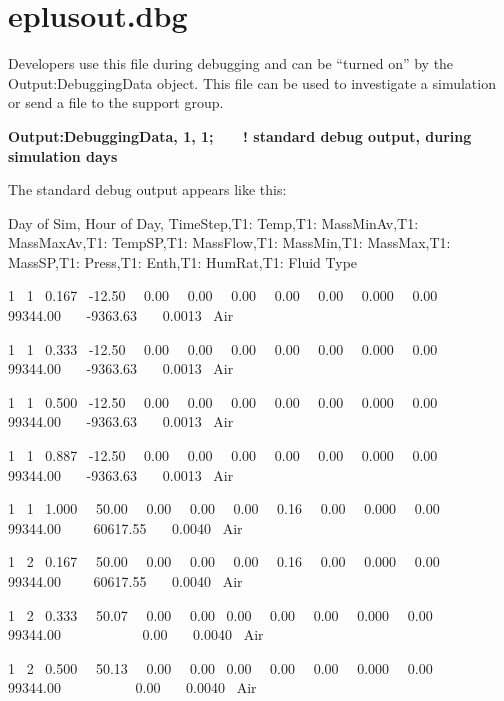 \section{eplusout.dbg}\label{eplusout.dbg}

Developers use this file during debugging and can be ``turned on'' by the Output:DebuggingData object. This file can be used to investigate a simulation or send a file to the support group.

\textbf{Output:DebuggingData, 1, 1;~~~ ! standard debug output, during simulation days}

The standard debug output appears like this:

Day of Sim, Hour of Day, TimeStep,T1: Temp,T1: MassMinAv,T1: MassMaxAv,T1: TempSP,T1: MassFlow,T1: MassMin,T1: MassMax,T1: MassSP,T1: Press,T1: Enth,T1: HumRat,T1: Fluid Type

1~ 1~ 0.167~ -12.50~~ 0.00~~ 0.00~~ 0.00~~ 0.00~~ 0.00~~ 0.000~~ 0.00~~ 99344.00~~~ -9363.63~~~ 0.0013~ Air

1~ 1~ 0.333~ -12.50~~ 0.00~~ 0.00~~ 0.00~~ 0.00~~ 0.00~~ 0.000~~ 0.00~~ 99344.00~~~ -9363.63~~~ 0.0013~ Air

1~ 1~ 0.500~ -12.50~~ 0.00~~ 0.00~~ 0.00~~ 0.00~~ 0.00~~ 0.000~~ 0.00~~ 99344.00~~~ -9363.63~~~ 0.0013~ Air

1~ 1~ 0.887~ -12.50~~ 0.00~~ 0.00~~ 0.00~~ 0.00~~ 0.00~~ 0.000~~ 0.00~~ 99344.00~~~ -9363.63~~~ 0.0013~ Air

1~ 1~ 1.000~~ 50.00~~ 0.00~~ 0.00~~ 0.00~~ 0.16~~ 0.00~~ 0.000~~ 0.00~~ 99344.00~~~~ 60617.55~~~ 0.0040~ Air

1~ 2~ 0.167~~ 50.00~~ 0.00~~ 0.00~~ 0.00~~ 0.16~~ 0.00~~ 0.000~~ 0.00~~ 99344.00~~~~ 60617.55~~~ 0.0040~ Air

1~ 2~ 0.333~~ 50.07~~ 0.00~~ 0.00~ 0.00~~ 0.00~~ 0.00~~ 0.000~~ 0.00~~ 99344.00~~~~~~~~~~~ 0.00~~~ 0.0040~ Air

1~ 2~ 0.500~~ 50.13~~ 0.00~~ 0.00~ 0.00~~ 0.00~~ 0.00~~ 0.000~~ 0.00~~ 99344.00~~~~~~~~~~ 0.00~~~ 0.0040~ Air
